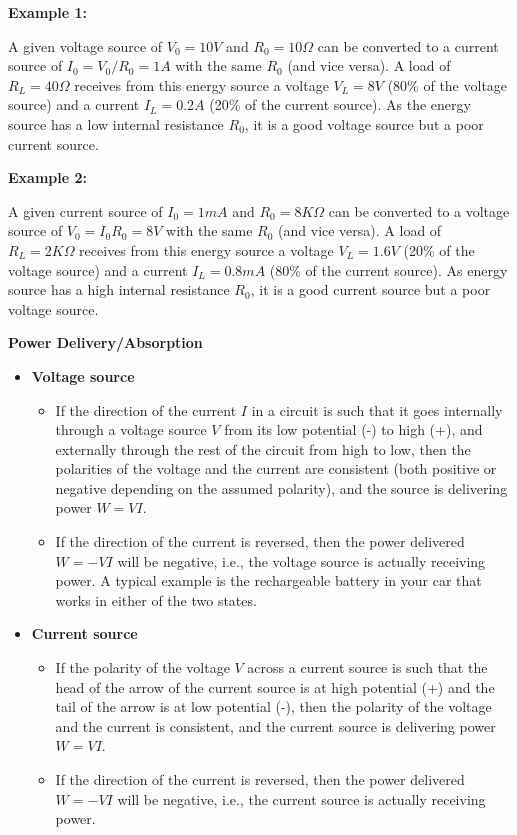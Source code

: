\begin{itemize}
{\bf Example 1:} 

A given voltage source of $V_0=10V$ and $R_0=10\Omega$ can be converted to a 
current source of $I_0=V_0/R_0=1A$ with the same $R_0$ (and vice versa). A load 
of $R_L=40\Omega$ receives from this energy source a voltage $V_L=8V$ (80\% of 
the voltage source) and a current $I_L=0.2A$ (20\% of the current source). As 
the energy source has a low internal resistance $R_0$, it is a good voltage 
source but a poor current source.


{\bf Example 2:} 

A given current source of $I_0=1 mA$ and $R_0=8 K\Omega$ can be converted to a 
voltage source of $V_0=I_0 R_0=8V$ with the same $R_0$ (and vice versa). A load 
of $R_L=2 K\Omega$ receives from this energy source a voltage $V_L=1.6V$ (20\%
of the voltage source) and a current $I_L=0.8 mA$ (80\% of the current source). 
As energy source has a high internal resistance $R_0$, it is a good current 
source but a poor voltage source.
				   

{\bf Power Delivery/Absorption}

\begin{itemize}
\item {\bf Voltage source}
  \begin{itemize}
  \item If the direction of the current $I$ in a circuit is such that it 
    goes internally through a voltage source $V$ from its low potential 
    (-) to high (+), and externally through the rest of the circuit from
    high to low, then the polarities of the voltage and the current are
    consistent (both positive or negative depending on the assumed 
    polarity), and the source is delivering power $W=VI$.
  \item If the direction of the current is reversed, then the power 
    delivered $W=-VI$ will be negative, i.e., the voltage source is actually 
    receiving power. A typical example is the rechargeable battery in your 
    car that works in either of the two states.
  \end{itemize}
\item {\bf Current source}
  \begin{itemize}
  \item If the polarity of the voltage $V$ across a current 
    source is such that the head of the arrow of the current source is
    at high potential (+) and the tail of the arrow is at low potential (-),
    then the polarity of the voltage and the current is consistent, and 
    the current source is delivering power $W=VI$.
  \item If the direction of the current is reversed, then the power 
    delivered $W=-VI$ will be negative, i.e., the current source is actually 
    receiving power. 
  \end{itemize}
\end{itemize}


\end{itemize}
